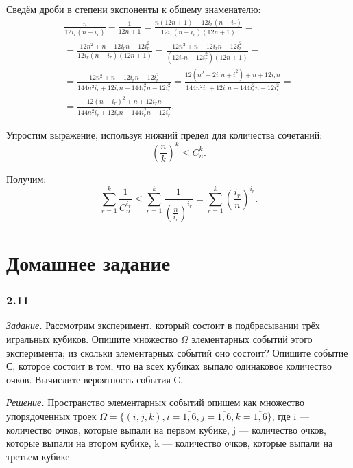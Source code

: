 \documentclass{book}
\begin{document}
Сведём дроби в степени экспоненты к общему знаменателю:
\begin{equation*}
\begin{split}
\frac{n}{12 i_r \left( n-i_r \right) } - \frac{1}{12 n + 1} =
\frac{n \left( 12 n + 1 \right) - 12 i_r \left( n-i_r \right) }{12 i_r \left( n-i_r \right) \left( 12 n + 1\right) } = \\
= \frac{12 n^2 + n - 12 i_r n + 12 i_r^2}{12 i_r \left( n-i_r \right) \left( 12 n + 1\right) } =
\frac{12 n^2 + n - 12 i_r n + 12 i_r^2}{ \left( 12 i_r n - 12 i_r^2 \right) \left( 12 n + 1 \right) } = \\
= \frac{12 n^2 + n - 12 i_r n + 12 i_r^2}{144 n^2 i_r + 12 i_r n - 144 i_r^2 n - 12 i_r^2} =
\frac{12 \left( n^2 -2 i_r n + i_r^2 \right) + n + 12 i_r n}{144 n^2 i_r + 12 i_r n - 144 i_r^2 n - 12 i_r^2} = \\
= \frac{12 \left( n-i_r\right)^2 + n + 12 i_r n }{144 n^2 i_r + 12 i_r n - 144 i_r^2 n - 12 i_r^2}.
\end{split}
\end{equation*}

Упростим выражение, используя нижний предел для количества сочетаний:
$$ \left( \frac{n}{k} \right)^k \leq C_n^k. $$

Получим:
$$\sum \limits_{r=1}^k \frac{1}{C_n^{i_r}} \leq
\sum \limits_{r=1}^k \frac{1}{\left( \frac{n}{i_r} \right)^{i_r}} =
\sum \limits_{r=1}^k \left( \frac{i_r}{n} \right)^{i_r}. $$

\section*{Домашнее задание}

\subsubsection*{2.11}

\textit{Задание.} Рассмотрим эксперимент, который состоит в подбрасывании трёх игральных кубиков.
Опишите множество $ \Omega $ элементарных событий этого эксперимента; из скольки элементарных событий оно состоит?
Опишите событие С, которое состоит в том, что на всех кубиках выпало одинаковое количество очков.
Вычислите вероятность события С.

\textit{Решение.} Пространство элементарных событий опишем как множество упорядоченных троек
$ \Omega = \{ \left( i, j, k \right),
i = \overline{ 1, 6 },
j = \overline{ 1, 6 },
k = \overline{ 1, 6 } \} $,
где i --- количество очков, которые выпали на первом кубике,
j --- количество очков, которые выпали на втором кубике,
k --- количество очков, которые выпали на третьем кубике.
\end{document}
